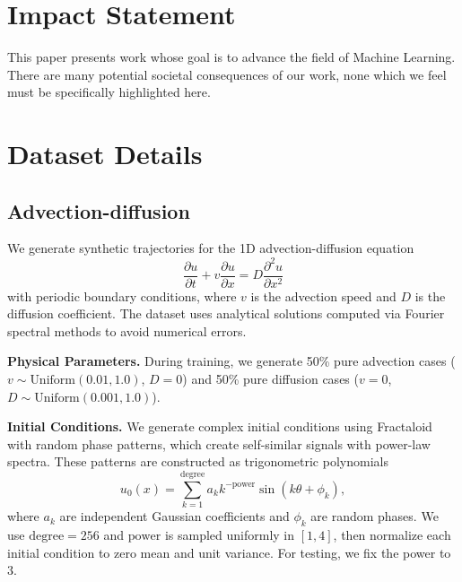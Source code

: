 \documentclass{article}
\theoremstyle{plain}
\theoremstyle{definition}
\theoremstyle{remark}
\begin{document}
\section*{Impact Statement}

This paper presents work whose goal is to advance the field of Machine
Learning. There are many potential societal consequences of our work, none
which we feel must be specifically highlighted here.





\newpage
\appendix
\onecolumn

\section{Dataset Details}

\subsection{Advection-diffusion}

We generate synthetic trajectories for the 1D advection-diffusion equation
\begin{equation}
\frac{\partial u}{\partial t} + v \frac{\partial u}{\partial x} = D \frac{\partial^2 u}{\partial x^2}
\end{equation}
with periodic boundary conditions, where $v$ is the advection speed and $D$ is the diffusion coefficient. The dataset uses analytical solutions computed via Fourier spectral methods to avoid numerical errors.

\textbf{Physical Parameters.} During training, we generate 50\% pure advection cases ($v \sim \text{Uniform}(0.01, 1.0)$, $D = 0$) and 50\% pure diffusion cases ($v = 0$, $D \sim \text{Uniform}(0.001, 1.0)$). 

\textbf{Initial Conditions.} We generate complex initial conditions using Fractaloid with random phase patterns, which create self-similar signals with power-law spectra. These patterns are constructed as trigonometric polynomials 
\begin{equation}
u_0(x) = \sum_{k=1}^{\text{degree}} a_k k^{-\text{power}} \sin(k\theta + \phi_k),
\end{equation}
where $a_k$ are independent Gaussian coefficients and $\phi_k$ are random phases. We use $\text{degree} = 256$ and $\text{power}$ is sampled uniformly in $[1,4]$, then normalize each initial condition to zero mean and unit variance. For testing, we fix the power to $3$.
\end{document}
